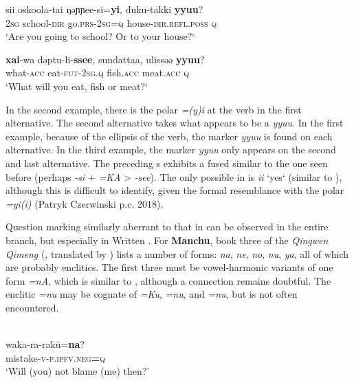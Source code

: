     \ex
    \gll sii oskoola-tai ŋəɲɲee-si=\textbf{yi}, duku-takki \textbf{yyuu}?\\
    2\textsc{sg} school-\textsc{dir} go.\textsc{prs}-2\textsc{sg}=\textsc{q} house-\textsc{dir.refl.poss} \textsc{q}\\
    \glt ‘Are you going to school? Or to your house?‘
    
    \ex
    \gll \textbf{xai}-wa dəptu-li-\textbf{ssee}, sundattaa, ulissəə \textbf{yyuu}?\\
    what-\textsc{acc} eat-\textsc{fut}-2\textsc{sg.q} fish.\textsc{acc} meat.\textsc{acc} \textsc{q}\\
    \glt ‘What will you eat, fish or meat?‘\z\z

In the second example, there is the polar  \textit{=(y)i} at the verb in the first alternative. The second alternative takes what appears to be a  \textit{yyuu}. In the first example, because of the ellipsis of the verb, the marker \textit{yyuu} is found on each alternative. In the third example, the marker \textit{yyuu} only appears on the second and last alternative. The preceding s exhibits a fused  similar to the one seen before (perhaps \textit{-si} + \textit{=KA} > \textit{-see}). The only possible  in  is \textit{ii} ‘yes‘ (similar to ), although this is difficult to identify, given the formal resemblance with the polar  \textit{=yi(i)} (Patryk Czerwinski p.c. 2018).

Question marking similarly aberrant to that in  can be observed in the entire  branch, but especially in Written . For \textbf{Manchu}, book three of the \textit{Qingwen Qimeng} (\citealt{Wuge1730}, translated by \citealt{Wylie1855}) lists a number of  forms: \textit{na}, \textit{ne}, \textit{no}, \textit{nu}, \textit{ya}, all of which are probably enclitics. The first three must be vowel-harmonic variants of one form \textit{=nA}, which is similar to , although a connection remains doubtful. The enclitic \textit{=nu} may be cognate of  \textit{=Ku},  \textit{=nu}, and  \textit{=nu}, but is not often encountered.

\ea%
    \label{ex:tungu:63}
    \\
    \ea
    \gll waka-ra-rak\=u=\textbf{{na}}?\\
    mistake-\textsc{v}-\textsc{p}.\textsc{ipfv}.\textsc{neg}\textbf{=}\textsc{q}\\
    \glt ‘Will (you) not blame (me) then?’
    
